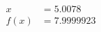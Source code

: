 \documentclass[preview]{standalone}
\begin{document}
\begin{align*}
x &= 5.0078\\f(x) &= 7.9999923
\end{align*}
\end{document}
